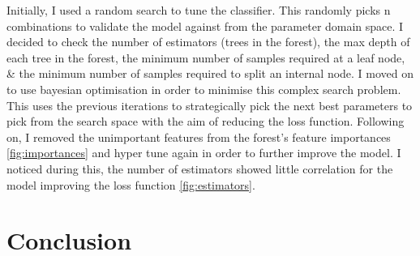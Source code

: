 \documentclass[11pt, a4paper]{article}
\begin{document}
\begin{multicols}{2}
Initially, I used a random search to tune the classifier. This randomly picks n combinations to validate the model against from the parameter domain space.
I decided to check the number of estimators (trees in the forest), the max depth of each tree in the forest, the minimum number of samples required at a leaf node, \& the minimum number of samples required to split an internal node.
I moved on to use bayesian optimisation in order to minimise this complex search problem. This uses the previous iterations to strategically pick the next best parameters to pick from the search space with the aim of reducing the loss function. 
Following on, I removed the unimportant features from the forest's feature importances \ref{fig:importances} and hyper tune again in order to further improve the model. I noticed during this, the number of estimators showed little correlation for the model improving the loss function \ref{fig:estimators}.  

\section{Conclusion}



\end{multicols}
\end{document}
